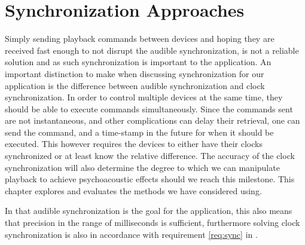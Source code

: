 \chapter{Synchronization Approaches}\label{cha:sync}
Simply sending playback commands between devices and hoping they are received fast enough to not disrupt the audible synchronization, is not a reliable solution and as such synchronization is important to the application.
An important distinction to make when discussing synchronization for our application is the difference between audible synchronization and clock synchronization.
In order to control multiple devices at the same time, they should be able to execute commands simultaneously.
Since the commands sent are not instantaneous, and other complications can delay their retrieval, one can send the command, and a time-stamp in the future for when it should be executed.
This however requires the devices to either have their clocks synchronized or at least know the relative difference.
The accuracy of the clock synchronization will also determine the degree to which we can manipulate playback to achieve psychoacoustic effects should we reach this milestone.
This chapter explores and evaluates the methods we have considered using.

In that audible synchronization is the goal for the application, this also means that precision in the range of milliseconds is sufficient, furthermore solving clock synchronization is also in accordance with requirement \ref{req:sync} in .


